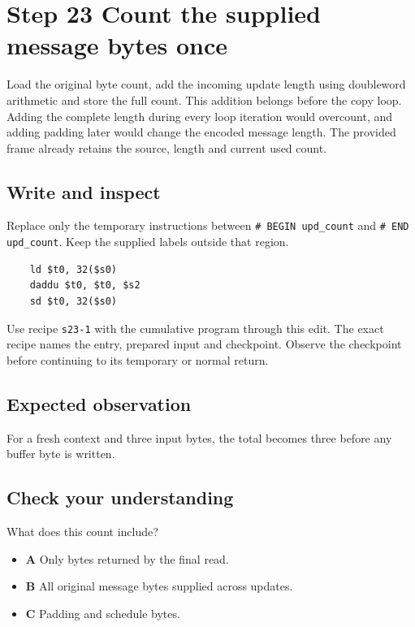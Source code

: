 \section{Step 23 Count the supplied message bytes once}\label{sha-s23}

Load the original byte count, add the incoming update length using doubleword arithmetic and store the full count. This addition belongs before the copy loop. Adding the complete length during every loop iteration would overcount, and adding padding later would change the encoded message length. The provided frame already retains the source, length and current used count.

\subsection{Write and inspect}
Replace only the temporary instructions between \texttt{\# BEGIN upd\_count} and \texttt{\# END upd\_count}. Keep the supplied labels outside that region.

\begin{verbatim}
    ld $t0, 32($s0)
    daddu $t0, $t0, $s2
    sd $t0, 32($s0)
\end{verbatim}

Use recipe \texttt{s23-1} with the cumulative program through this edit. The exact recipe names the entry, prepared input and checkpoint. Observe the checkpoint before continuing to its temporary or normal return.

\subsection{Expected observation}
For a fresh context and three input bytes, the total becomes three before any buffer byte is written.

\subsection{Check your understanding}
What does this count include?

\begin{itemize}
  \item \textbf{A} Only bytes returned by the final read.
  \item \textbf{B} All original message bytes supplied across updates.
  \item \textbf{C} Padding and schedule bytes.
\end{itemize}
